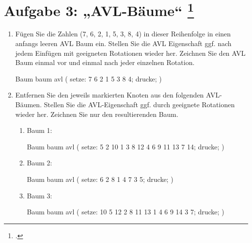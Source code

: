 \documentclass{lehramt-informatik-aufgabe}
\begin{document}
\liAufgabenTitel{}
\section{Aufgabe 3: „AVL-Bäume“
\footcite{66115:2014:03}}

\begin{enumerate}


\item Fügen Sie die Zahlen (7, 6, 2, 1, 5, 3, 8, 4) in dieser
Reihenfolge in einen anfangs leeren AVL Baum ein. Stellen Sie die AVL
Eigenschaft ggf. nach jedem Einfügen mit geeigneten Rotationen wieder
her. Zeichnen Sie den AVL Baum einmal vor und einmal nach jeder
einzelnen Rotation.

\begin{liProjektSprache}{Baum}
baum avl (
  setze: 7 6 2 1 5 3 8 4;
  drucke;
)
\end{liProjektSprache}


\item Entfernen Sie den jeweils markierten Knoten aus den folgenden
AVL-Bäumen. Stellen Sie die AVL-Eigenschaft ggf. durch geeignete
Rotationen wieder her. Zeichnen Sie nur den resultierenden Baum.

\begin{enumerate}


\item Baum 1:

\begin{liProjektSprache}{Baum}
baum avl (
  setze: 5 2 10 1 3 8 12 4 6 9 11 13 7 14;
  drucke;
)
\end{liProjektSprache}


\item Baum 2:

\begin{liProjektSprache}{Baum}
baum avl (
  setze: 6 2 8 1 4 7 3 5;
  drucke;
)
\end{liProjektSprache}


\item Baum 3:

\begin{liProjektSprache}{Baum}
baum avl (
  setze: 10 5 12 2 8 11 13 1 4 6 9 14 3 7;
  drucke;
)
\end{liProjektSprache}


\end{enumerate}
\end{enumerate}
\end{document}
